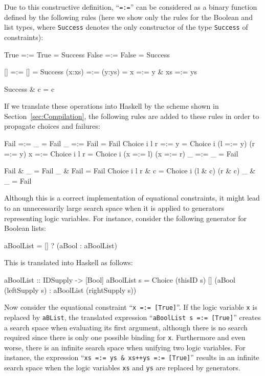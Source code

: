 \documentclass{llncs}
\newcommand{\code}[1]{\mbox{\small\texttt{#1}}}
\newcommand{\ccode}[1]{``\code{#1}''}
\begin{document}
Due to this constructive definition, \ccode{=:=}
can be considered as a binary function defined by the
following rules (here we show only the rules for the Boolean
and list types, where \code{Success} denotes the only constructor
of the type \code{Success} of constraints):
\begin{curry}
  True   =:= True    =  Success
  False  =:= False   =  Success

  []     =:= []      =  Success
  (x:xs) =:= (y:ys)  =  x =:= y & xs =:= ys

  Success & c  =  c
\end{curry}
%
If we translate these operations into Haskell by the scheme
shown in Section~\ref{sec:Compilation},
the following rules are added to these rules
in order to propagate choices and failures:
\begin{haskell}
  Fail         =:= _             =  Fail
  _            =:= Fail          =  Fail
  Choice i l r =:= y             =  Choice i (l =:= y) (r =:= y)
  x            =:= Choice i l r  =  Choice i (x =:= l) (x =:= r)
  _            =:= _             =  Fail

  Fail         & _     =  Fail
  _            & Fail  =  Fail
  Choice i l r & c     =  Choice i (l & c) (r & c)
  _            & _     =  Fail

\end{haskell}
%
Although this is a correct implementation of equational constraints,
it might lead to an unnecessarily large search space
when it is applied to generators representing logic variables.
For instance, consider the following generator for Boolean lists:
\begin{curry}
  aBoolList = [] ? (aBool : aBoolList)
\end{curry}
This is translated into Haskell as follows:
\begin{haskell}
  aBoolList :: IDSupply -> [Bool]
  aBoolList s = Choice (thisID s) [] (aBool (leftSupply s)
                                      : aBoolList (rightSupply s))
\end{haskell}
Now consider the equational constraint \ccode{x =:= [True]}.
If the logic variable \code{x} is replaced by \code{aBList},
the translated expression \ccode{aBoolList s =:= [True]}
creates a search space when evaluating its first argument,
although there is no search required since there is only one possible
binding for \code{x}.
Furthermore and even worse, there is an infinite search space
when unifying two logic variables. For instance,
the expression \ccode{xs =:= ys \& xs++ys =:= [True]}
results in an infinite search space when the logic variables
\code{xs} and \code{ys} are replaced by generators.
\end{document}
